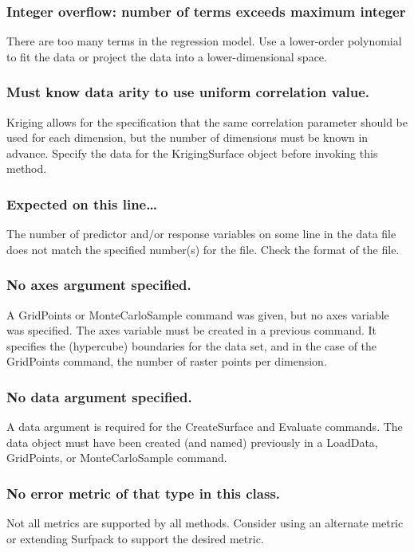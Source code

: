 \documentclass{article}
\begin{document}
\subsubsection{Integer overflow: number of terms exceeds maximum integer}
There are too many terms in the regression model.  Use a lower-order polynomial
to fit the data or project the data into a lower-dimensional space.

\subsubsection{Must know data arity to use uniform correlation value.}
Kriging allows for the specification that the same correlation parameter should
be used for each dimension, but the number of dimensions must be known in
advance.  Specify the data for the KrigingSurface object before invoking this
method.

\subsubsection{Expected on this line\ldots}
The number of predictor and/or response variables on some line in the data file
does not match the specified number(s) for the file.  Check the format of the
file.

\subsubsection{No axes argument specified.}
A GridPoints or MonteCarloSample command was given, but no axes variable was
specified.  The axes variable must be created in a previous command.  It
specifies the (hypercube) boundaries for the data set, and in the case of the
GridPoints command, the number of raster points per dimension.

\subsubsection{No data argument specified.}
A data argument is required for the CreateSurface and Evaluate commands.  The
data object must have been created (and named) previously in a LoadData,
GridPoints, or MonteCarloSample command.

\subsubsection{No error metric of that type in this class.}
Not all metrics are supported by all methods.  Consider using an alternate
metric or extending Surfpack to support the desired metric.
\end{document}

